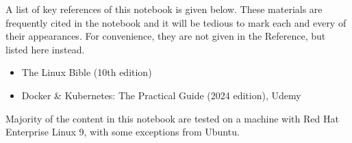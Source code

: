 A list of key references of this notebook is given below. These materials are frequently cited in the notebook and it will be tedious to mark each and every of their appearances. For convenience, they are not given in the Reference, but listed here instead.

\begin{itemize}
	\item The Linux Bible (10th edition)
	\item Docker \& Kubernetes: The Practical Guide (2024 edition), Udemy
\end{itemize}
 
 Majority of the content in this notebook are tested on a machine with Red Hat Enterprise Linux 9, with some exceptions from Ubuntu. 